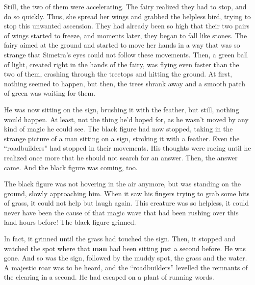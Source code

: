Still, the two of them were accelerating. The fairy realized they had to stop, and do so quickly. Thus, she spread her wings and grabbed the helpless bird, trying to stop this unwanted ascension. They had already been so high that their two pairs of wings started to freeze, and moments later, they began to fall like stones. The fairy aimed at the ground and started to move her hands in a way that was so strange that Simetra's eyes could not follow these movements. Then, a green ball of light, created right in the hands of the fairy, was flying even faster than the two of them, crashing through the treetops and hitting the ground. At first, nothing seemed to happen, but then, the trees shrank away and a smooth patch of green was waiting for them. 

\froufrou{}

He was now sitting on the sign, brushing it with the feather, but still, nothing would happen. At least, not the thing he'd hoped for, as he wasn't moved by any kind of magic he could see. The black figure had now stopped, taking in the strange picture of a man sitting on a sign, stroking it with a feather. Even the \enquote{roadbuilders} had stopped in their movements.
His thoughts were racing until he realized once more that he should not search for an answer. Then, the answer came. And the black figure was coming, too.

\froufrou{}

The black figure was not hovering in the air anymore, but was standing on the ground, slowly approaching him. When it saw his fingers trying to grab some bits of grass, it could not help but laugh again. This creature was so helpless, it could never have been the cause of that magic wave that had been rushing over this land hours before! 
The black figure grinned.

In fact, it grinned until the grass had touched the sign. Then, it stopped and watched the spot where that \textbf{man} had been sitting just a second before. 
He was gone. 
And so was the sign, followed by the muddy spot, the grass and the water. A majestic roar was to be heard, and the \enquote{roadbuilders} levelled the remnants of the clearing in a second.
He had escaped on a plant of running words.
